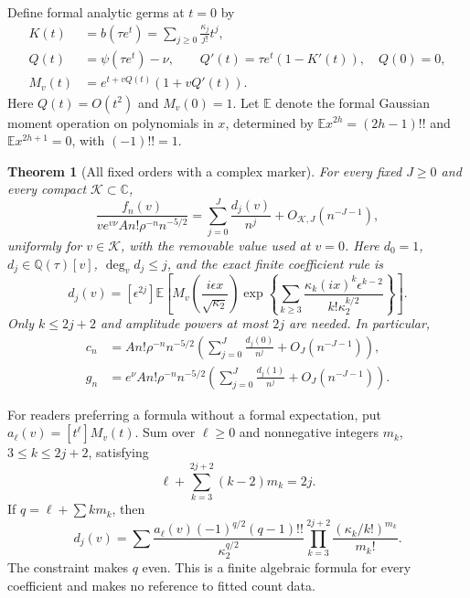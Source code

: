 \documentclass[11pt,letterpaper]{article}
\numberwithin{equation}{section}
\newtheorem{theorem}{Theorem}[section]
\theoremstyle{remark}\newtheorem{remark}[theorem]{Remark}
\newcommand{\CC}{\mathbb C}
\newcommand{\QQ}{\mathbb Q}
\newcommand{\EE}{\mathbb E}
\begin{document}
Define formal analytic germs at $t=0$ by
\begin{align}
 K(t)&=b(\tau e^t)=\sum_{j\geq0}\frac{\kappa_j}{j!}t^j,\label{lop:eq:K}\\
 Q(t)&=\psi(\tau e^t)-\nu,\qquad
 Q'(t)=\tau e^t(1-K'(t)),\quad Q(0)=0,\label{lop:eq:Q}\\
 M_v(t)&=e^{t+vQ(t)}(1+vQ'(t)).\label{lop:eq:M}
\end{align}
Here $Q(t)=O(t^2)$ and $M_v(0)=1$.
Let $\EE$ denote the formal Gaussian moment operation on polynomials
in $x$, determined by
$\EE x^{2h}=(2h-1)!!$ and $\EE x^{2h+1}=0$, with $(-1)!!=1$.

\begin{theorem}[All fixed orders with a complex marker]\label{lop:thm:main}
For every fixed $J\geq0$ and every compact $\mathcal K\subset\CC$,
\begin{equation}\label{lop:eq:main}
 \frac{f_n(v)}{v e^{v\nu}A n!\rho^{-n}n^{-5/2}}
 =\sum_{j=0}^{J}\frac{d_j(v)}{n^j}
       +O_{\mathcal K,J}(n^{-J-1}),
\end{equation}
uniformly for $v\in\mathcal K$, with the removable value used at $v=0$.
Here $d_0=1$, $d_j\in\QQ(\tau)[v]$, $\deg_v d_j\leq j$, and the exact
finite coefficient rule is
\begin{equation}\label{lop:eq:generator}
 d_j(v)=[\epsilon^{2j}]\EE\left[
 M_v\left(\frac{i\epsilon x}{\sqrt{\kappa_2}}\right)
 \exp\left\{\sum_{k\geq3}
 \frac{\kappa_k(i x)^k\epsilon^{k-2}}
      {k!\kappa_2^{k/2}}\right\}\right].
\end{equation}
Only $k\leq2j+2$ and amplitude powers at most $2j$ are needed.
In particular,
\begin{align}
 c_n&=A n!\rho^{-n}n^{-5/2}
 \left(\sum_{j=0}^{J}\frac{d_j(0)}{n^j}+O_J(n^{-J-1})\right),\label{lop:eq:conna}\\
 g_n&=e^\nu A n!\rho^{-n}n^{-5/2}
 \left(\sum_{j=0}^{J}\frac{d_j(1)}{n^j}+O_J(n^{-J-1})\right).\label{lop:eq:alla}
\end{align}
\end{theorem}

For readers preferring a formula without a formal expectation, put
$a_\ell(v)=[t^\ell]M_v(t)$. Sum over $\ell\geq0$ and nonnegative
integers $m_k$, $3\leq k\leq2j+2$, satisfying
\[
 \ell+\sum_{k=3}^{2j+2}(k-2)m_k=2j.
\]
If $q=\ell+\sum k m_k$, then
\begin{equation}\label{lop:eq:finitesum}
 d_j(v)=\sum
 \frac{a_\ell(v)(-1)^{q/2}(q-1)!!}{\kappa_2^{q/2}}
 \prod_{k=3}^{2j+2}\frac{(\kappa_k/k!)^{m_k}}{m_k!}.
\end{equation}
The constraint makes $q$ even. This is a finite algebraic formula for
every coefficient and makes no reference to fitted count data.
\end{document}
